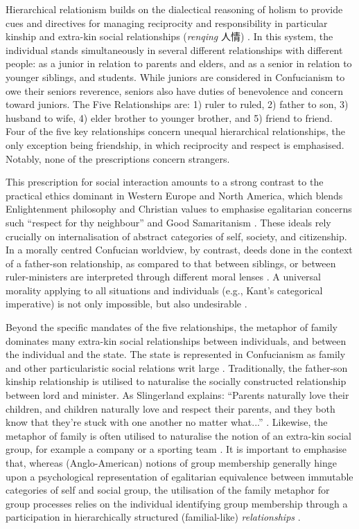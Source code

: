 \begin{CJK}{UTF8}{gbsn}
Hierarchical relationism builds on the dialectical reasoning of holism to provide cues and directives for managing reciprocity and responsibility in particular kinship and extra-kin social relationships (\textit{renqing} 人情) \citep{Maehr1980}.  In this system, the individual stands simultaneously in several different relationships with different people: as a junior in relation to parents and elders, and as a senior in relation to younger siblings, and students. While juniors are considered in Confucianism to owe their seniors reverence, seniors also have duties of benevolence and concern toward juniors. The Five Relationships are: 1) ruler to ruled, 2) father to son, 3) husband to wife, 4) elder brother to younger brother, and 5) friend to friend. Four of the five key relationships concern unequal hierarchical relationships, the only exception being friendship, in which reciprocity and respect is emphasised.  Notably, none of the prescriptions concern strangers.

This prescription for social interaction amounts to a strong contrast to the practical ethics dominant in Western Europe and North America, which blends Enlightenment philosophy and Christian values to emphasise egalitarian concerns such ``respect for thy neighbour'' and Good Samaritanism \citep{Liu2005}.  These ideals rely crucially on internalisation of abstract categories of self, society, and citizenship.  In a morally centred Confucian worldview, by contrast, deeds done in the context of a father-son relationship, as compared to that between siblings, or between ruler-ministers are interpreted through different moral lenses \citep{Liu2011}.  A universal morality applying to all situations and individuals (e.g., Kant’s categorical imperative) is not only impossible, but also undesirable \citep{Bedford2003}.

Beyond the specific mandates of the five relationships, the metaphor of family dominates many extra-kin social relationships between individuals, and between the individual and the state. The state is represented in Confucianism as family and other particularistic social relations writ large \citep[579]{Liu2009}.  Traditionally, the father-son kinship relationship is utilised to naturalise the socially constructed relationship between lord and minister.  As Slingerland explains: ``Parents naturally love their children, and children naturally love and respect their parents, and they both know that they're stuck with one another no matter what...'' \citep[178]{Slingerland2014}. Likewise, the metaphor of family is often utilised to naturalise the notion of an extra-kin social group, for example a company or a sporting team \citep{Brownell2008}.
It is important to emphasise that, whereas (Anglo-American) notions of group membership generally hinge upon a psychological representation of egalitarian equivalence between immutable categories of self and social group, the utilisation of the family metaphor for group processes relies on the individual identifying group membership through a participation in hierarchically structured (familial-like) \textit{relationships} \citep{Fei1992}.


\end{CJK}

